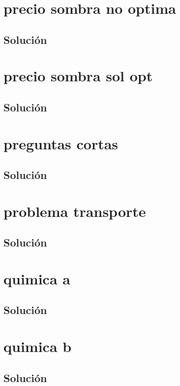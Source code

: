 \documentclass[a4paper,10pt,onecolumn]{report}
\begin{document}
\section{precio sombra no optima}

\subsection*{Solución}

\clearpage
\section{precio sombra sol opt}

\subsection*{Solución}

\clearpage
\section{preguntas cortas}

\subsection*{Solución}

\clearpage
\section{problema transporte}

\subsection*{Solución}

\clearpage
\section{quimica a}

\subsection*{Solución}

\clearpage
\section{quimica b}

\subsection*{Solución}

\clearpage
\end{document}
